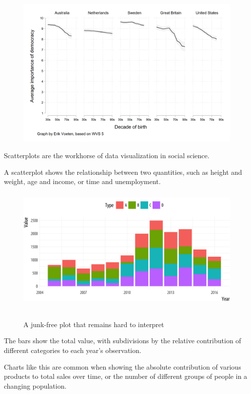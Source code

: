 \documentclass[11pt]{beamer}
\begin{document}
\begin{frame}
	
	\frametitle{\bfseries}
	\begin{figure}
		\vspace{-1em}
		\includegraphics[width=0.9\linewidth]{Figure/democracy-voeten-version-2}
	\end{figure}
	\begin{itemize}
		\vspace{-1em}
		\footnotesize{
			\item Scatterplots are the workhorse of data visualization in social science.
			\item A scatterplot shows the relationship between two quantities, such as height and weight, age and income, or time and unemployment. }
	\end{itemize}
\end{frame}
\begin{frame}
	
	\frametitle{\bfseries}
	\begin{figure}
		\vspace{-.5em}
		\includegraphics[width=0.8\linewidth]{Figure/preception-data-1}
		
		\\
		\tiny{A junk-free plot that remains hard to interpret}
		\label{fig:anscombe-1}
	\end{figure}
	\begin{itemize}
		\footnotesize{
			\item The bars show the total value, with subdivisions by the relative contribution of different categories to each year’s observation.
			\item Charts like this are common when showing the absolute contribution of various products to total sales over time, or the number of different groups of people in a changing population.
		}
	\end{itemize}
\end{frame}
\end{document}
